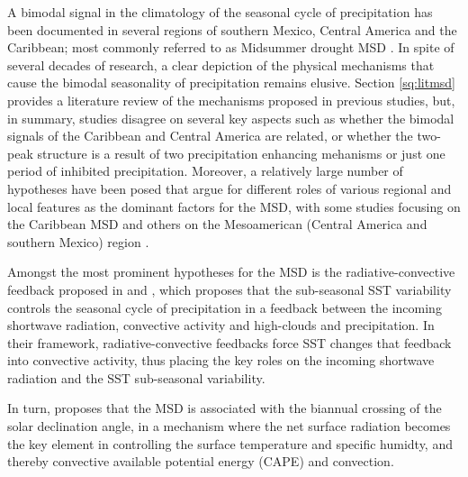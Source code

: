 A bimodal signal in the climatology of the seasonal cycle of precipitation has been documented in several regions of southern Mexico, Central America and the Caribbean; most commonly referred to as Midsummer drought MSD \citep{mosino1966,magana1999,gamble2008,perdigon2018,zhao2020}.  
In spite of several decades of research, a clear depiction of the physical mechanisms that cause the bimodal seasonality of precipitation remains elusive.
Section \ref{sq:litmsd} provides a literature review of the mechanisms proposed in previous studies, but, in summary, studies disagree on several key aspects such as whether the bimodal signals of the Caribbean and Central America are related, or whether the two-peak structure is a result of two precipitation enhancing mehanisms or just one period of inhibited precipitation. Moreover, a relatively large number of hypotheses have been posed that argue for different roles of various regional and local features as the dominant factors for the MSD, with some studies focusing on the Caribbean MSD \citep[][]{martinez2019} and others on the Mesoamerican (Central America and southern Mexico) region \citep[e.g][]{perdigon2018}.



Amongst the most prominent hypotheses for the MSD is the radiative-convective feedback proposed in \cite{magana1999} and \cite{magana2005}, which proposes that the sub-seasonal SST variability controls the seasonal cycle of precipitation in a feedback between the incoming shortwave radiation, convective activity and high-clouds and precipitation. In their framework, radiative-convective feedbacks force SST changes that feedback into convective activity, thus placing the key roles on the incoming shortwave radiation and the SST sub-seasonal variability. 

In turn, \cite{karnauskas2013} proposes that the MSD is associated with the biannual crossing of the solar declination angle, in a mechanism where the net surface radiation becomes the key element in controlling the surface temperature and specific humidty, and thereby convective available potential energy (CAPE) and convection. 

